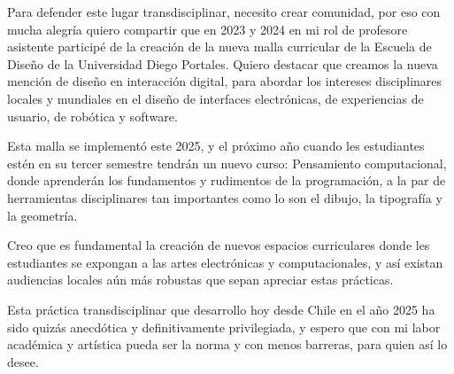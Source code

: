 \documentclass{article}
\begin{document}
Para defender este lugar transdisciplinar, necesito crear comunidad, por eso con mucha alegría quiero compartir que en 2023 y 2024 en mi rol de profesore asistente participé de la creación de la nueva malla curricular de la Escuela de Diseño de la Universidad Diego Portales. Quiero destacar que creamos la nueva mención de diseño en interacción digital, para abordar los intereses disciplinares locales y mundiales en el diseño de interfaces electrónicas, de experiencias de usuario, de robótica y software.

Esta malla se implementó este 2025, y el próximo año cuando les estudiantes estén en su tercer semestre tendrán un nuevo curso: Pensamiento computacional, donde aprenderán los fundamentos y rudimentos de la programación, a la par de herramientas disciplinares tan importantes como lo son el dibujo, la tipografía y la geometría.

Creo que es fundamental la creación de nuevos espacios curriculares donde les estudiantes se expongan a las artes electrónicas y computacionales, y así existan audiencias locales aún más robustas que sepan apreciar estas prácticas.

Esta práctica transdisciplinar que desarrollo hoy desde Chile en el año 2025 ha sido quizás anecdótica y definitivamente privilegiada, y espero que con mi labor académica y artística pueda ser la norma y con menos barreras, para quien así lo desee.

\clearpage

\printbibliography[title={Bibliografía}, heading=bibintoc]
\end{document}

